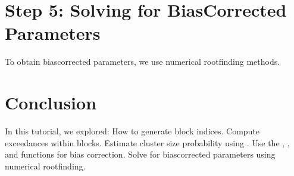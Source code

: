 \documentclass[a4paper,11pt,openany,english]{sphinxmanual}
\begin{document}
\section{Step 5: Solving for Bias\sphinxhyphen{}Corrected Parameters}
\label{\detokenize{biascorrection:step-5-solving-for-bias-corrected-parameters}}
\sphinxAtStartPar
To obtain bias\sphinxhyphen{}corrected parameters, we use numerical root\sphinxhyphen{}finding methods.

\begin{sphinxVerbatim}[commandchars=\\\{\}]
 
        \PYG{p}{[} \PYG{p}{]}
     

  
         \PYG{p}{[} \PYG{p}{]}
     

  
  
\end{sphinxVerbatim}


\section{Conclusion}
\label{\detokenize{biascorrection:conclusion}}
\sphinxAtStartPar
In this tutorial, we explored:
\sphinxhyphen{} How to generate block indices.
\sphinxhyphen{} Compute exceedances within blocks.
\sphinxhyphen{} Estimate cluster size probability using .
\sphinxhyphen{} Use the , , and  functions for bias correction.
\sphinxhyphen{} Solve for bias\sphinxhyphen{}corrected parameters using numerical root\sphinxhyphen{}finding.
\end{document}
